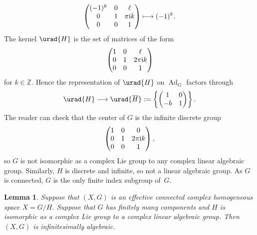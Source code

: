 \documentclass[10pt,a4paper]{amsart}
\numberwithin{equation}{section}
\newtheorem{Lemma}[Theorem]{Lemma}
\newcommand{\Z}{\mathbb{Z}}
\DeclareMathOperator{\Ad}{Ad}
\begin{document}
\begin{Example}
\[\begin{pmatrix}
(-1)^k & 0 & \ell \\
0 & 1 & \pi {\rm i} k \\
0 & 0 & 1
\end{pmatrix}
 \longmapsto (-1)^k.
\]
The kernel $\urad{H}$ is the set of matrices of the form
\[
\begin{pmatrix}
1 & 0 & \ell \\
0 & 1 & 2\pi {\rm i} k \\
0 & 0 & 1
\end{pmatrix}
\]
for $k \in \Z$.
Hence the representation of $\urad{H}$ on $\Ad_G$ factors through
\[
\urad{H} \longrightarrow \urad{\overline{H}} := \left\{\begin{pmatrix}1&0\\-b&1\end{pmatrix}\right\}.
\]
The reader can check that the center of $G$ is the infinite discrete group
\[
\begin{pmatrix}
1 & 0 & 0 \\
0 & 1 & 2\pi {\rm i} k \\
0 & 0 & 1
\end{pmatrix},
\]
so $G$ is not isomorphic as a complex Lie group to any complex linear algebraic group.
Similarly, $H$ is discrete and infinite, so not a linear algebraic group.
As $G$ is connected, $G$ is the only finite index subgroup of~$G$.
\end{Example}

\begin{Lemma}
Suppose that $(X, G)$ is an effective connected complex homogeneous space $X=G/H$.
Suppose that $G$ has finitely many components and $H$ is isomorphic as a complex Lie group to a complex linear algebraic group.
Then $(X, G)$ is infinitesimally algebraic.
\end{Lemma}
\end{document}
